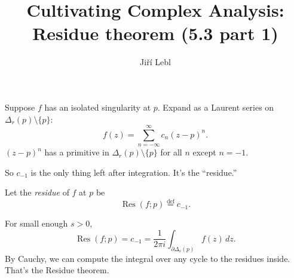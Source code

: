 \documentclass[10pt,aspectratio=169]{beamer}
\author{Ji\v{r}\'i Lebl}
\institute[OSU]{%
Departemento pri Matematiko de Oklahoma {\^S}tata Universitato}
\title{Cultivating Complex Analysis:\\%
Residue theorem (5.3 part 1)}
\date{}
\begin{document}
\begin{frame}
\titlepage
\end{frame}

\begin{frame}
Suppose $f$ has an isolated singularity at $p$.
\pause Expand 
as a Laurent series on $\Delta_r(p) \setminus \{ p \}$:
\[
f(z) = \sum_{n=-\infty}^\infty c_n {(z-p)}^n .
\]
\pause
${(z-p)}^n$ has a primitive in 
$\Delta_r(p) \setminus \{ p \}$ for all $n$ except $n=-1$.

\medskip
\pause

So $c_{-1}$ is the only thing left after integration. \pause It's the ``residue.''

\pause

\begin{definition}
Let the \emph{residue} of $f$ at $p$ be
\begin{equation*}
\operatorname{Res}(f;p)
\overset{\text{def}}{=}
c_{-1} .
\end{equation*}
\end{definition}

\pause

For small enough $s > 0$,
\[
\operatorname{Res}(f;p) 
=
c_{-1}
=
\frac{1}{2\pi i} \int_{\partial \Delta_{s}(p)} f(z) \, dz .
\]
\pause
By Cauchy, we can compute the integral over any cycle to the residues
inside.  That's the Residue theorem.
\end{frame}
\end{document}
